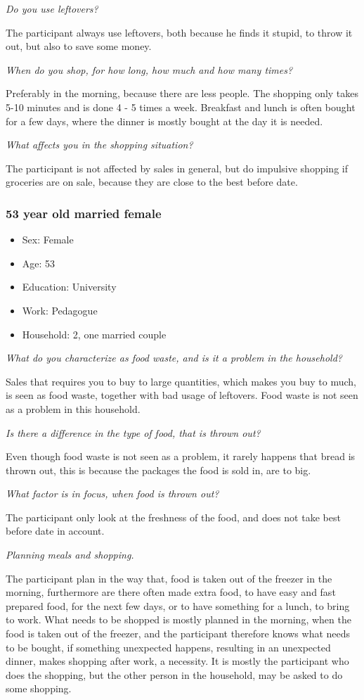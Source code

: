 \emph{Do you use leftovers?}

The participant always use leftovers, both because he finds it stupid, to throw it out, but also to save some money.

\emph{When do you shop, for how long, how much and how many times?}

Preferably in the morning, because there are less people. The shopping only takes 5-10 minutes and is done 4 - 5 times a week. Breakfast and lunch is often bought for a few days, where the dinner is mostly bought at the day it is needed.

\emph{What affects you in the shopping situation?}

The participant is not affected by sales in general, but do impulsive shopping if groceries are on sale, because they are close to the best before date.
\subsubsection{53 year old married female}
\begin{itemize}
  \item Sex: Female
  \item Age: 53
  \item Education: University
  \item Work: Pedagogue
  \item Household: 2, one married couple
\end{itemize}
\emph{What do you characterize as food waste, and is it a problem in the household?}

Sales that requires you to buy to large quantities, which makes you buy to much, is seen as food waste, together with bad usage of leftovers. Food waste is not seen as a problem in this household.

\emph{Is there a difference in the type of food, that is thrown out?}

Even though food waste is not seen as a problem, it rarely happens that bread is thrown out, this is because the packages the food is sold in, are to big.

\emph{What factor is in focus, when food is thrown out?}

The participant only look at the freshness of the food, and does not take best before date in account.

\emph{Planning meals and shopping.}

The participant plan in the way that, food is taken out of the freezer in the morning, furthermore are there often made extra food, to have easy and fast prepared food, for the next few days, or to have something for a lunch, to bring to work. What needs to be shopped is mostly planned in the morning, when the food is taken out of the freezer, and the participant therefore knows what needs to be bought, if something unexpected happens, resulting in an unexpected dinner, makes shopping after work, a necessity. It is mostly the participant who does the shopping, but the other person in the household, may be asked to do some shopping.

